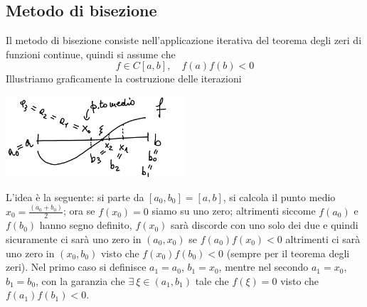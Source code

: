 \documentclass[12pt]{article}
\begin{document}
\subsection{Metodo di bisezione}
Il metodo di bisezione consiste nell'applicazione iterativa del teorema degli zeri di funzioni continue, quindi si assume che 
\[f \in C[a,b], \quad f(a)f(b)<0\]
Illustriamo graficamente la costruzione delle iterazioni
\begin{center}
            \includegraphics[width=0.5\textwidth]{im_pag10.png}\par
\end{center}
L'idea è la seguente: si parte da $[a_0,b_0]=[a,b]$, si calcola il punto medio $x_0=\frac{(a_0+b_0)}{2}$; ora se $f(x_0)=0$ siamo su uno zero; altrimenti siccome $f(a_0)$ e $f(b_0)$ hanno segno definito, $f(x_0)$ sarà discorde con uno solo dei due e quindi sicuramente ci sarà uno zero in $(a_0,x_0)$ se $f(a_0)f(x_0)<0$ altrimenti ci sarà uno zero in $(x_0, b_0)$ visto che $f(x_0)f(b_0)<0$ (sempre per il teorema degli zeri). Nel primo caso si definisce $a_1=a_0$, $b_1=x_0$, mentre nel secondo $a_1=x_0$, $b_1=b_0$, con la garanzia che $\exists \ \xi \in (a_1,b_1)$ tale che $f(\xi)=0$ visto che $f(a_1)f(b_1)<0$.
\end{document}

